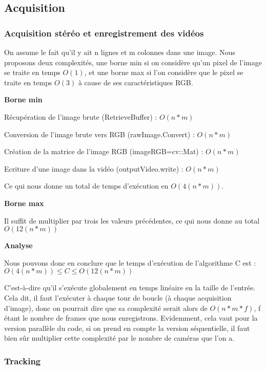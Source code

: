 \subsection{Acquisition}

\subsubsection{Acquisition stéréo et enregistrement des vidéos}

On assume le fait qu'il y ait n lignes et m colonnes dans une image. Nous proposons deux complexités, une borne min si on considère qu'un pixel de l'image se traite en temps $O(1)$, et une borne max si l'on considère que le pixel se traite en temps $O(3)$ à cause de ses caractéristiques RGB.

\textbf{Borne min}

Récupération de l'image brute (RetrieveBuffer) : $O(n*m)$

Conversion de l'image brute vers RGB (rawImage.Convert) : $O(n*m)$

Création de la matrice de l'image RGB (imageRGB=cv::Mat) : $O(n*m)$

Ecriture d'une image dans la vidéo (outputVideo.write) : $O(n*m)$

Ce qui nous donne un total de temps d'exécution en $O(4(n*m))$.

\textbf{Borne max}

Il suffit de multiplier par trois les valeurs précédentes, ce qui nous donne au total $O(12(n*m))$

\textbf{Analyse}

Nous pouvons donc en conclure que le temps d'exécution de l'algorithme C est :
$O(4(n*m)) \leq C \leq O(12(n*m))$

C'est-à-dire qu'il s'exécute globalement en temps linéaire en la taille de l'entrée. Cela dit, il faut l'exécuter à chaque tour de boucle (à chaque acquisition d'image), donc on pourrait dire que sa complexité serait alors de $O(n*m*f)$, f étant le nombre de frames que nous enregistrons. Evidemment, cela vaut pour la version parallèle du code, si on prend en compte la version séquentielle, il faut bien sûr multiplier cette complexité par le nombre de caméras que l'on a.

\subsubsection{Tracking}

